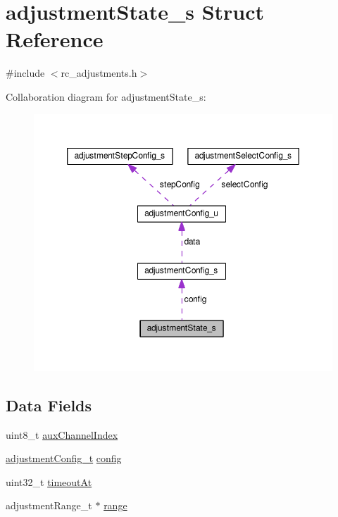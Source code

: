 \hypertarget{structadjustmentState__s}{\section{adjustment\+State\+\_\+s Struct Reference}
\label{structadjustmentState__s}
}


{\ttfamily \#include $<$rc\+\_\+adjustments.\+h$>$}



Collaboration diagram for adjustment\+State\+\_\+s\+:\nopagebreak
\begin{figure}[H]
\begin{center}
\leavevmode
\includegraphics[width=350pt]{structadjustmentState__s__coll__graph}
\end{center}
\end{figure}
\subsection*{Data Fields}
\begin{DoxyCompactItemize}
\item 
uint8\+\_\+t \hyperlink{structadjustmentState__s_a9878b9b6d0291b8429c50a95da18b157}{aux\+Channel\+Index}
\item 
\hyperlink{io_2rc__adjustments_8h_a09ea19d3d5181bf6a70d0407eab90592}{adjustment\+Config\+\_\+t} \hyperlink{structadjustmentState__s_a8ae513ba533a8433e6e851807d2c686a}{config}
\item 
uint32\+\_\+t \hyperlink{structadjustmentState__s_ace95b148ccd10341e032271da8240a3c}{timeout\+At}
\item 
adjustment\+Range\+\_\+t $\ast$ \hyperlink{structadjustmentState__s_a5bafae6bc4f67d3cd0760f11bd80f67f}{range}
\end{DoxyCompactItemize}


